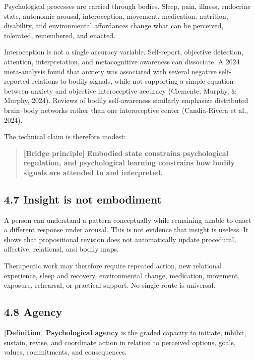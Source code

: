 \documentclass[
  11pt,
]{article}
\begin{document}
Psychological processes are carried through bodies. Sleep, pain,
illness, endocrine state, autonomic arousal, interoception, movement,
medication, nutrition, disability, and environmental affordances change
what can be perceived, tolerated, remembered, and enacted.

Interoception is not a single accuracy variable. Self-report, objective
detection, attention, interpretation, and metacognitive awareness can
dissociate. A 2024 meta-analysis found that anxiety was associated with
several negative self-reported relations to bodily signals, while not
supporting a simple equation between anxiety and objective interoceptive
accuracy (Clemente, Murphy, \& Murphy, 2024). Reviews of bodily
self-awareness similarly emphasize distributed brain--body networks
rather than one interoceptive center (Candia-Rivera et al., 2024).

The technical claim is therefore modest:

\begin{quote}
\textbf{{[}Bridge principle{]} Embodied state constrains psychological
regulation, and psychological learning constrains how bodily signals are
attended to and interpreted.}
\end{quote}

\subsection{4.7 Insight is not
embodiment}\label{insight-is-not-embodiment}

A person can understand a pattern conceptually while remaining unable to
enact a different response under arousal. This is not evidence that
insight is useless. It shows that propositional revision does not
automatically update procedural, affective, relational, and bodily maps.

Therapeutic work may therefore require repeated action, new relational
experience, sleep and recovery, environmental change, medication,
movement, exposure, rehearsal, or practical support. No single route is
universal.

\subsection{4.8 Agency}\label{agency}

\textbf{{[}Definition{]} Psychological agency} is the graded capacity to
initiate, inhibit, sustain, revise, and coordinate action in relation to
perceived options, goals, values, commitments, and consequences.
\end{document}
